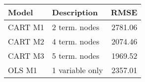 \begin{tabular}{llr}
  \toprule
Model & Description & RMSE \\ 
  \midrule
CART M1 & 2 term. nodes & 2781.06 \\ 
  CART M2 & 4 term. nodes & 2074.46 \\ 
  CART M3 & 5 term. nodes & 1969.52 \\ 
  OLS M1  & 1 variable only & 2357.01 \\ 
   \bottomrule
\end{tabular}
